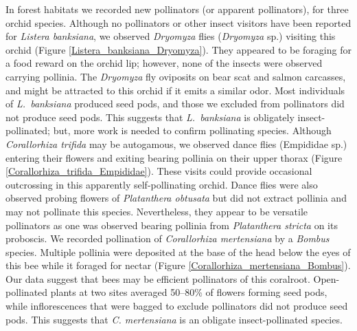 \begin{multicols}{2}
In forest habitats we recorded new pollinators (or apparent
pollinators), for three orchid species. Although no pollinators or other
insect visitors have been reported for \emph{Listera banksiana}, we
observed \emph{Dryomyza} flies (\emph{Dryomyza} sp.) visiting this orchid
(Figure \ref{Listera_banksiana_Dryomyza}). They appeared to be foraging for a food reward on the orchid
lip; however, none of the insects were observed carrying pollinia. The
\emph{Dryomyza} fly oviposits on bear scat and salmon carcasses, and might be
attracted to this orchid if it emits a similar odor. Most individuals of
\emph{L.\ banksiana} produced seed pods, and those we excluded from
pollinators did not produce seed pods. This suggests that \emph{L.\
banksiana} is obligately insect-pollinated; but, more work is needed to
confirm pollinating species. Although \emph{Corallorhiza trifida} may be
autogamous, we observed dance flies (Empididae sp.) entering their
flowers and exiting bearing pollinia on their upper thorax (Figure \ref{Corallorhiza_trifida_Empididae}).
These visits could provide occasional outcrossing in this apparently
self-pollinating orchid. Dance flies were also observed probing flowers
of \emph{Platanthera obtusata} but did not extract pollinia and may not
pollinate this species. Nevertheless, they appear to be versatile
pollinators as one was observed bearing pollinia from \emph{Platanthera
stricta} on its proboscis. We recorded pollination of \emph{Corallorhiza
mertensiana} by a \emph{Bombus} species. Multiple pollinia were
deposited at the base of the head below the eyes of this bee while it
foraged for nectar (Figure \ref{Corallorhiza_mertensiana_Bombus}). Our data suggest that bees may be
efficient pollinators of this coralroot. Open-pollinated plants at two
sites averaged 50--80\% of flowers forming seed pods, while
inflorescences that were bagged to exclude pollinators did not produce
seed pods. This suggests that \emph{C. mertensiana} is an obligate
insect-pollinated species.


\end{multicols}
